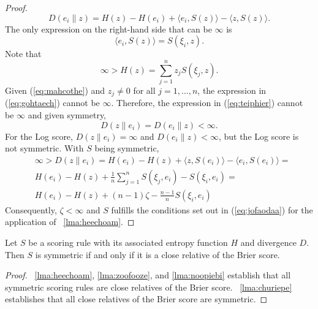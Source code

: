 \documentclass[12pt]{article}
\begin{document}
\begin{proof}
\begin{equation}
  \label{eq:teiphier}
  D(e_{i}\|z)=H(z)-H(e_{i})+\langle{}e_{i},S(z)\rangle-\langle{}z,S(z)\rangle.
\end{equation}
The only expression on the right-hand side that can be $\infty$ is 
\begin{equation}
  \label{eq:gohtaech}
\langle{}e_{i},S(z)\rangle=S(\xi_{i},z).
\end{equation}
Note that 
\begin{equation}
  \label{eq:mahcothe}
  \infty>H(z)=\sum_{j=1}^{n}z_{j}S(\xi_{j},z).
\end{equation}
Given (\ref{eq:mahcothe}) and $z_{j}\neq{}0$ for all $j=1,{\ldots},n$,
the expression in (\ref{eq:gohtaech}) cannot be $\infty$. Therefore,
the expression in (\ref{eq:teiphier}) cannot be $\infty$ and given
symmetry,
\begin{equation}
  \label{eq:iecheehe}
  D(z\|e_{i})=D(e_{i}\|z)<\infty.
\end{equation}
For the Log score, $D(z\|e_{i})=\infty$ and $D(e_{i}\|z)<\infty$, but
the Log score is not symmetric. With $S$ being symmetric,
\begin{equation}
  \label{eq:aipaemal}
  \begin{split}
  & \infty>D(z\|e_{i})=H(e_{i})-H(z)+\langle{}z,S(e_{i})\rangle-\langle{}e_{i},S(e_{i})\rangle= \\
  & H(e_{i})-H(z)+\frac{1}{n}\sum_{j=1}^{n}S(\xi_{j},e_{i})-S(\xi_{i},e_{i})= \\
  & H(e_{i})-H(z)+(n-1)\zeta-\frac{n-1}{n}S(\xi_{i},e_{i})
  \end{split}
\end{equation}
Consequently, $\zeta<\infty$ and $S$ fulfills the conditions set
out in (\ref{eq:jofaodaa}) for the application of
{\emma}~\ref{lma:heechoam}.
\end{proof}

\begin{theorem}
  \label{thm:iechohng}
  Let $S$ be a scoring rule with its associated entropy function $H$
  and divergence $D$. Then $S$ is symmetric if and only if it is a
  close relative of the Brier score.
\end{theorem}


\begin{proof}
  \label{prf:sohthaik} {\Emmas}~\ref{lma:heechoam},
  \ref{lma:zoofooze}, and \ref{lma:noopiebi} establish that all
  symmetric scoring rules are close relatives of the Brier score.
  {\Emma}~\ref{lma:churiepe} establishes that all close relatives
  of the Brier score are symmetric.
\end{proof}
\end{document}
